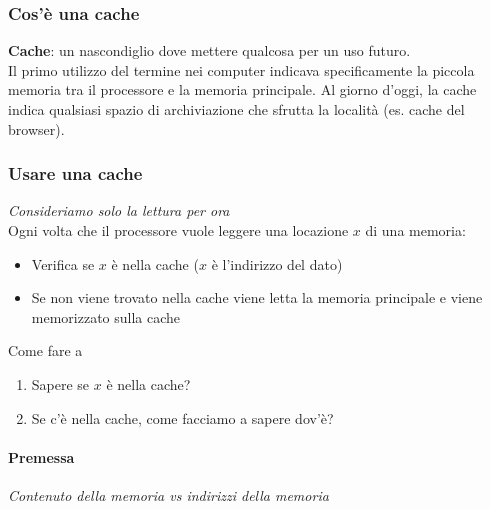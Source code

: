 \documentclass[12pt,a4paper]{article}
\begin{document}
\subsubsection{Cos'è una cache}
\textbf{Cache}: un nascondiglio dove mettere qualcosa per un uso futuro.\\
Il primo utilizzo del termine nei computer indicava specificamente la piccola memoria tra il processore e la memoria principale. Al giorno d'oggi, la cache indica qualsiasi spazio di archiviazione che sfrutta la località (es. cache del browser).

\subsubsection{Usare una cache}
\textsl{Consideriamo solo la lettura per ora}\\
Ogni volta che il processore vuole leggere una locazione $x$ di una memoria:
\begin{itemize}
\item Verifica se $x$ è nella cache ($x$ è l'indirizzo del dato)
\item Se non viene trovato nella cache viene letta la memoria principale e viene memorizzato sulla cache
\end{itemize}
Come fare a
\begin{enumerate}
\item Sapere se $x$ è nella cache?
\item Se c'è nella cache, come facciamo a sapere dov'è?
\end{enumerate}

\paragraph{Premessa}
\textsl{Contenuto della memoria vs indirizzi della memoria}\\
\end{document}
